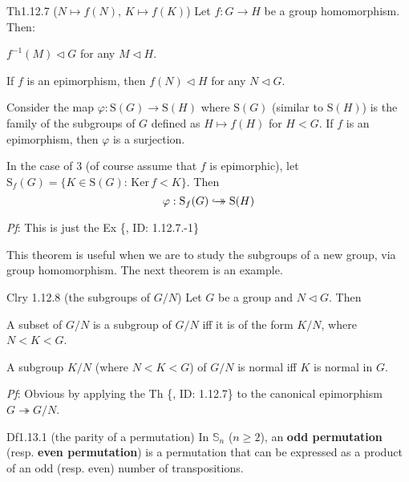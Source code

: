 \documentclass{article}
\newcommand{\nles}{\vartriangleleft}
\newcommand{\Ker}{\text{Ker}\,}
\newcommand{\hooktwoheadrightarrow}{%
        \hookrightarrow\mathrel{\mspace{-15mu}}\rightarrow}
\begin{document}
\begin{Th}{Th1.12.7 ($N\mapsto f(N)$, $K\mapsto f(K)$)}
    Let $f: G\to H$ be a group homomorphism. Then:
    \begin{compactenum}
        \item $f^{-1}(M) \nles G$ for any $M\nles H$.
        \item If $f$ is an epimorphism, then $f(N)\nles H$ for any $N\nles G$.
        \item Consider the map $\varphi: \mathrm{S}(G)\to\mathrm{S}(H)$ where $\mathrm{S}(G)$ (similar to $\mathrm{S}(H)$) is the family of the subgroups of $G$ defined as $H\mapsto f(H)$ for $H<G$. If $f$ is an epimorphism, then $\varphi$ is a surjection.
        \item In the case of 3 (of course assume that $f$ is epimorphic), let $\mathrm{S}_f(G) = \{K\in\mathrm{S}(G): \,\Ker f<K\}$. Then 
        $$ \varphi: \mathrm{S}_f(G)\hooktwoheadrightarrow\mathrm{S}(H) $$
    \end{compactenum}
    \tcblower
    \textit{Pf}: This is just the Ex \{, ID: 1.12.7.-1\}
\end{Th}

\begin{Rmk}{}
    This theorem is useful when we are to study the subgroups of a new group, via group homomorphism. The next theorem is an example.
\end{Rmk}

\begin{Th}{Clry 1.12.8 (the subgroups of $G/N$)}
    Let $G$ be a group and $N\nles G$. Then
    \begin{compactenum}
        \item A subset of $G/N$ is a subgroup of $G/N$ iff it is of the form $K/N$, where $N<K<G$.
        \item A subgroup $K/N$ (where $N<K<G$) of $G/N$ is normal iff $K$ is normal in $G$.
    \end{compactenum}
    \tcblower
    \textit{Pf}: Obvious by applying the Th \{, ID: 1.12.7\} to the canonical epimorphism $G\twoheadrightarrow G/N$.
\end{Th}

\begin{Df}{Df1.13.1 (the parity of a permutation)}
    In $\mathbb{S}_n$ ($n\geq 2$), an \textbf{odd permutation} (resp. \textbf{even permutation}) is a permutation that can be expressed as a product of an odd (resp. even) number of transpositions. 
\end{Df}
\end{document}
